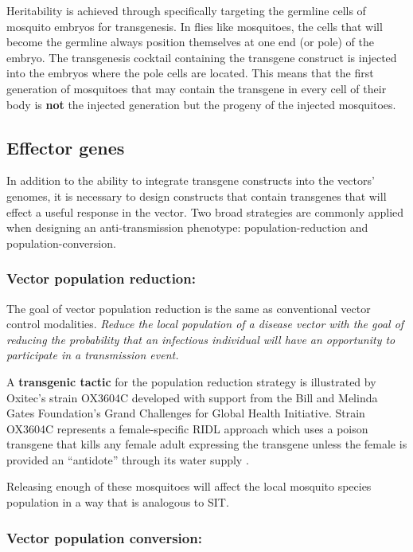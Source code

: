 Heritability is achieved through specifically targeting the \gls{germline} cells of mosquito embryos for transgenesis.
In flies like mosquitoes, the cells that will become the germline always position themselves at one end (or pole) of the embryo.
The transgenesis cocktail containing the transgene construct is injected into the embryos where the pole cells are located.
This means that the first generation of mosquitoes that may contain the transgene in every cell of their body is \textbf{not} the injected generation but the progeny of the injected mosquitoes.

\subsection{Effector genes}

In addition to the ability to integrate transgene constructs into the vectors' genomes, it is necessary to design constructs that contain transgenes that will effect a useful response in the vector.
Two broad strategies are commonly applied when designing an anti-transmission phenotype: \gls{population-reduction} and \gls{population-conversion}.

\subsubsection{Vector population reduction:}

The goal of vector population reduction is the same as conventional vector control modalities.
\emph{Reduce the local population of a disease vector with the goal of reducing the probability that an infectious individual will have an opportunity to participate in a transmission event.}


A \textbf{transgenic tactic} for the population reduction strategy is illustrated by Oxitec's \Aa strain OX3604C developed with support from the Bill and Melinda Gates Foundation's Grand Challenges for Global Health Initiative.
Strain OX3604C represents a female-specific \gls{RIDL} approach which uses a poison transgene that kills any female adult expressing the transgene unless the female is provided an ``antidote'' through its water supply \cite{WisedeValdez2011,Bargielowski2012,Facchinelli2013}.

Releasing enough of these mosquitoes will affect the local mosquito species population in a way that is analogous to \gls{SIT}.

\subsubsection{Vector population conversion:}

